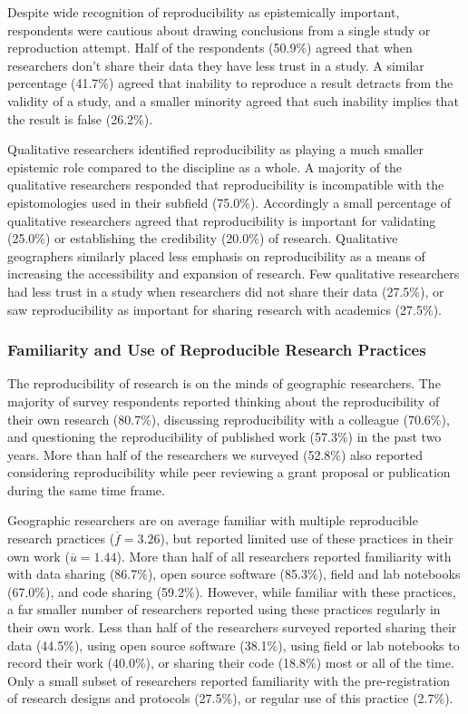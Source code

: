 \documentclass[]{interact}
\theoremstyle{plain}%
\theoremstyle{definition}
\theoremstyle{remark}
\begin{document}
Despite wide recognition of reproducibility as epistemically important, respondents were cautious about drawing conclusions from a single study or reproduction attempt. 
Half of the respondents (50.9\%) agreed that when researchers don't share their data they have less trust in a study.
A similar percentage (41.7\%) agreed that inability to reproduce a result detracts from the validity of a study, and a smaller minority agreed that such inability implies that the result is false (26.2\%).

Qualitative researchers identified reproducibility as playing a much smaller epistemic role compared to the discipline as a whole. 
A majority of the qualitative researchers responded that reproducibility is incompatible with the epistomologies used in their subfield (75.0\%).
Accordingly a small percentage of qualitative researchers agreed that reproducibility is important for validating (25.0\%) or establishing the credibility (20.0\%) of research.
Qualitative geographers similarly placed less emphasis on reproducibility as a means of increasing the accessibility and expansion of research.
Few qualitative researchers had less trust in a study when researchers did not share their data (27.5\%), or saw reproducibility as important for sharing research with academics (27.5\%).



\subsubsection*{Familiarity and Use of Reproducible Research Practices}
The reproducibility of research is on the minds of geographic researchers. 
The majority of survey respondents reported thinking about the reproducibility of their own research (80.7\%), discussing reproducibility with a colleague (70.6\%), and questioning the reproducibility of published work (57.3\%) in the past two years. 
More than half of the researchers we surveyed (52.8\%) also reported considering reproducibility while peer reviewing a grant proposal or publication during the same time frame. 

Geographic researchers are on average familiar with multiple reproducible research practices ($\overline{f}=3.26$), but reported limited use of these practices in their own work ($\overline{u}=1.44$).
More than half of all researchers reported familiarity with with data sharing (86.7\%), open source software (85.3\%), field and lab notebooks (67.0\%), and code sharing (59.2\%).
However, while familiar with these practices, a far smaller number of researchers reported using these practices regularly in their own work. 
Less than half of the researchers surveyed reported sharing their data (44.5\%), using open source software (38.1\%), using field or lab notebooks to record their work (40.0\%), or sharing their code (18.8\%) most or all of the time. 
Only a small subset of researchers reported familiarity with the pre-registration of research designs and protocols (27.5\%), or regular use of this practice (2.7\%).
\end{document}
